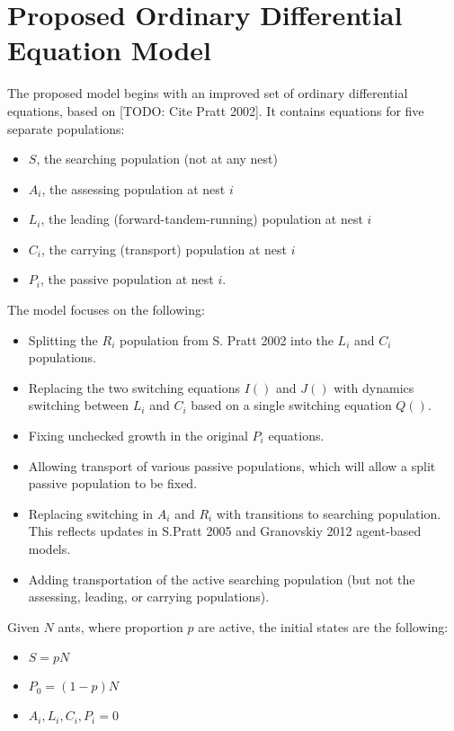\documentclass[letterpaper]{article}
\begin{document}
  \section{Proposed Ordinary Differential Equation Model}

  The proposed model begins with an improved set of ordinary differential equations, based on [TODO: Cite Pratt 2002].
  It contains equations for five separate populations: 
  \begin{itemize}
      \item $S$, the searching population (not at any nest)
      \item $A_i$, the assessing population at nest $i$
      \item $L_i$, the leading (forward-tandem-running) population at nest $i$
      \item $C_i$, the carrying (transport) population at nest $i$
      \item $P_i$, the passive population at nest $i$. 
  \end{itemize}
  The model focuses on the following:
  \begin{itemize}
      \item Splitting the $R_i$ population from S. Pratt 2002 into the $L_i$ and $C_i$ populations.
      \item Replacing the two switching equations $I()$ and $J()$ with dynamics switching between $L_i$ and $C_i$ based on a single switching equation $Q()$.
      \item Fixing unchecked growth in the original $P_i$ equations.
      \item Allowing transport of various passive populations, which will allow a split passive population to be fixed.
      \item Replacing switching in $A_i$ and $R_i$ with transitions to searching population. This reflects updates in S.Pratt 2005 and Granovskiy 2012 agent-based models.
      \item Adding transportation of the active searching population (but not the assessing, leading, or carrying populations).
  \end{itemize}

  Given $N$ ants, where proportion $p$ are active, the initial states are the following:
  \begin{itemize}
      \item $S = pN$
      \item $P_0 = (1-p)N$ 
      \item $A_i, L_i, C_i, P_i = 0$ 
  \end{itemize}
\end{document}
